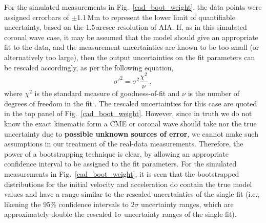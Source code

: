 \documentclass[structabstract]{aa}
\begin{document}
For the simulated measurements in Fig.~\ref{cad_boot_weight}, the data points were assigned errorbars of $\pm1.1$\,Mm to represent the lower limit of quantifiable uncertainty, based on the 1.5\,arcsec resolution of AIA. If, as in this simulated coronal wave case, it may be assumed that the model should give an appropriate fit to the data, and the measurement uncertainties are known to be too small (or alternatively too large), then the output uncertainties on the fit parameters can be rescaled accordingly, as per the following equation,
\begin{equation}
\sigma'^2 = \sigma^2 \frac{\chi^2}{\nu} \ ,
\end{equation}
where $\chi^2$ is the standard measure of goodness-of-fit and $\nu$ is the number of degrees of freedom in the fit \citep[see, for example,][]{2003drea.book.....B}. The rescaled uncertainties for this case are quoted in the top panel of Fig.~\ref{cad_boot_weight}. However, since in truth we do not know the exact kinematic form a CME or coronal wave should take nor the true uncertainty due to {\bf possible unknown sources of error}, we cannot make such assumptions in our treatment of the real-data measurements. Therefore, the power of a bootstrapping technique is clear, by allowing an appropriate confidence interval to be assigned to the fit parameters. For the simulated measurements in Fig.~\ref{cad_boot_weight}, it is seen that the bootstrapped distributions for the initial velocity and acceleration do contain the true model values and have a range similar to the rescaled uncertainties of the single fit (i.e., likening the 95\% confidence intervals to $2\sigma$ uncertainty ranges, which are approximately double the rescaled $1\sigma$ uncertainty ranges of the single fit).
\end{document}
